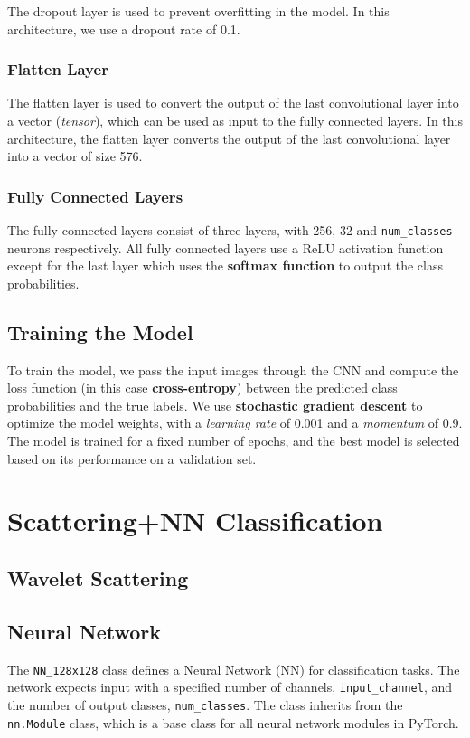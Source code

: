 \documentclass{report}
\begin{document}
The dropout layer is used to prevent overfitting in the model. In this architecture, we use a dropout rate of 0.1.
\subsection{Flatten Layer}

The flatten layer is used to convert the output of the last convolutional layer into a vector (\textit{tensor}), which can be used as input to the fully connected layers. In this architecture, the flatten layer converts the output of the last convolutional layer into a vector of size 576.

\subsection{Fully Connected Layers}
The fully connected layers consist of three layers, with 256, 32 and \texttt{num\_classes}  neurons respectively. All fully connected layers use a ReLU activation function except for the last layer which uses the \textbf{softmax function} to output the class probabilities.

\section{Training the Model}

To train the model, we pass the input images through the CNN and compute the loss function (in this case \textbf{cross-entropy}) between the predicted class probabilities and the true labels. We use \textbf{stochastic gradient descent} to optimize the model weights, with a \textit{learning rate} of 0.001 and a \textit{momentum} of 0.9. The model is trained for a fixed number of epochs, and the best model is selected based on its performance on a validation set.

\chapter{Scattering+NN Classification}
\section{Wavelet Scattering}
\section{Neural Network}
The \texttt{NN\_128x128} class defines a Neural Network (NN) for classification tasks. The network expects input with a specified number of channels, \texttt{input\_channel}, and the number of output classes, \texttt{num\_classes}. The class inherits from the \texttt{nn.Module} class, which is a base class for all neural network modules in PyTorch.
\end{document}
